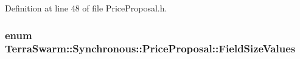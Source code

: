 Definition at line 48 of file Price\-Proposal.\-h.

\hypertarget{class_terra_swarm_1_1_synchronous_1_1_price_proposal_ab2ea7dd828cca1f7635018608f595f0b}{
\subsubsection[{Field\-Size\-Values}]{\setlength{\rightskip}{0pt plus 5cm}enum {\bf Terra\-Swarm\-::\-Synchronous\-::\-Price\-Proposal\-::\-Field\-Size\-Values}\hspace{0.3cm}{\ttfamily [private]}}}\label{class_terra_swarm_1_1_synchronous_1_1_price_proposal_ab2ea7dd828cca1f7635018608f595f0b}
